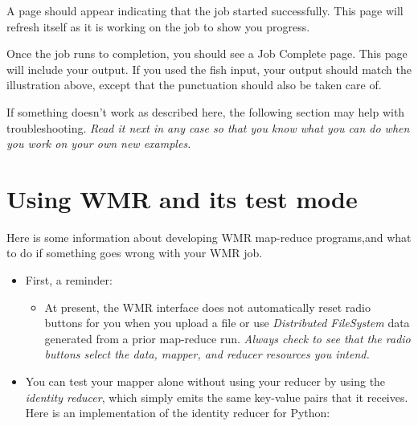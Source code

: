 \documentclass[letterpaper,10pt,openany,oneside]{sphinxmanual}
\begin{document}
A page should appear indicating that the job started successfully.
This page will refresh itself as it is working on the job to show
you progress.

Once the job runs to completion, you should see a Job Complete page.
This page will include your output. If you used the fish input,
your output should match the illustration above, except that the
punctuation should also be taken care of.

If something doesn't work as described here, the following section
may help with troubleshooting. \emph{Read it next in any case so that you
know what you can do when you work on your own new examples.}


\section{Using WMR and its test mode}
\label{wmr_basic/wmr_multi_language:using-wmr-and-its-test-mode}
Here is some information about developing WMR map-reduce
programs,and what to do if something goes wrong with your WMR job.
\begin{itemize}
\item {} 
First, a reminder:
\begin{itemize}
\item {} 
At present, the WMR interface does not automatically reset radio
buttons for you when you upload a file or use \emph{Distributed
FileSystem} data generated from a prior map-reduce run.
\emph{Always check to see that the radio buttons select the data, mapper, and reducer resources you intend.}

\end{itemize}

\item {} 
You can test your mapper alone without using your reducer by
using the \emph{identity reducer}, which simply emits the same key-value
pairs that it receives. Here is an implementation of the identity
reducer for Python:

\end{itemize}
\end{document}
